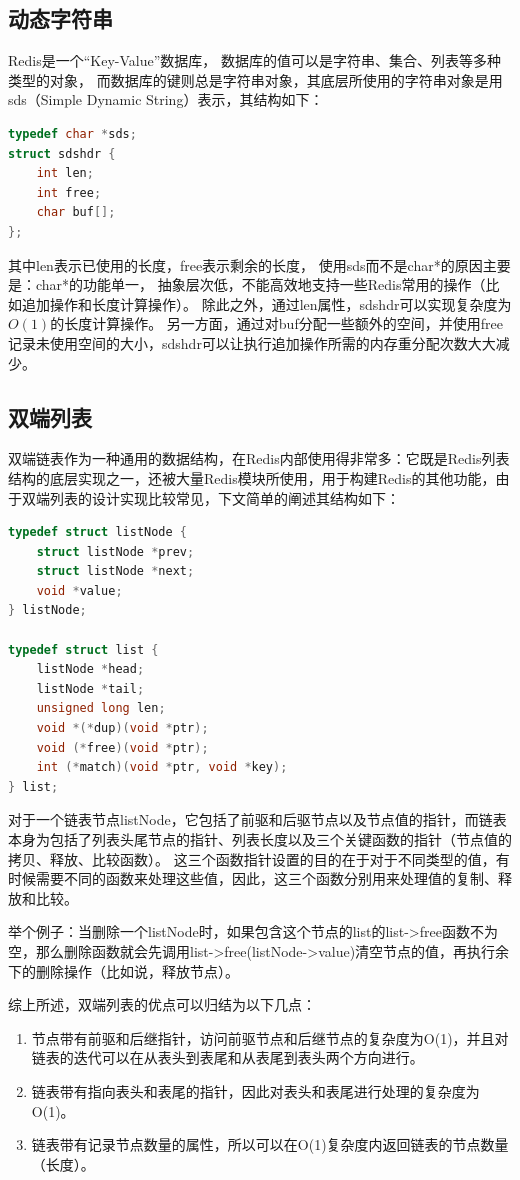 \documentclass{zjutthesis}
\begin{document}
\subsection{动态字符串}
Redis是一个“Key-Value”数据库， 数据库的值可以是字符串、集合、列表等多种类型的对象， 而数据库的键则总是字符串对象，其底层所使用的字符串对象是用sds（Simple Dynamic String）表示，其结构如下：
\begin{lstlisting}[language=C]
typedef char *sds;
struct sdshdr {
    int len;
    int free;
    char buf[];
};
\end{lstlisting}
其中len表示已使用的长度，free表示剩余的长度，
使用sds而不是char*的原因主要是：char*的功能单一， 抽象层次低，不能高效地支持一些Redis常用的操作（比如追加操作和长度计算操作）。
除此之外，通过len属性，sdshdr可以实现复杂度为$O(1)$的长度计算操作。
另一方面，通过对buf分配一些额外的空间，并使用free记录未使用空间的大小，sdshdr可以让执行追加操作所需的内存重分配次数大大减少。


\subsection{双端列表}
双端链表作为一种通用的数据结构，在Redis内部使用得非常多：它既是Redis列表结构的底层实现之一，还被大量Redis模块所使用，用于构建Redis的其他功能，由于双端列表的设计实现比较常见，下文简单的阐述其结构如下：
\begin{lstlisting}[language=C]
typedef struct listNode {
    struct listNode *prev;
    struct listNode *next;
    void *value;
} listNode;

typedef struct list {
    listNode *head;
    listNode *tail;
    unsigned long len;
    void *(*dup)(void *ptr);
    void (*free)(void *ptr);
    int (*match)(void *ptr, void *key);
} list;
\end{lstlisting}
对于一个链表节点listNode，它包括了前驱和后驱节点以及节点值的指针，而链表本身为包括了列表头尾节点的指针、列表长度以及三个关键函数的指针（节点值的拷贝、释放、比较函数）。
这三个函数指针设置的目的在于对于不同类型的值，有时候需要不同的函数来处理这些值，因此，这三个函数分别用来处理值的复制、释放和比较。

举个例子：当删除一个listNode时，如果包含这个节点的list的list->free函数不为空，那么删除函数就会先调用list->free(listNode->value)清空节点的值，再执行余下的删除操作（比如说，释放节点）。

综上所述，双端列表的优点可以归结为以下几点：

\begin{enumerate}[label=（\arabic*）]
\item{节点带有前驱和后继指针，访问前驱节点和后继节点的复杂度为O(1)，并且对链表的迭代可以在从表头到表尾和从表尾到表头两个方向进行。}
\item{链表带有指向表头和表尾的指针，因此对表头和表尾进行处理的复杂度为O(1)。}
\item{链表带有记录节点数量的属性，所以可以在O(1)复杂度内返回链表的节点数量（长度）。}
\end{enumerate}
\end{document}
